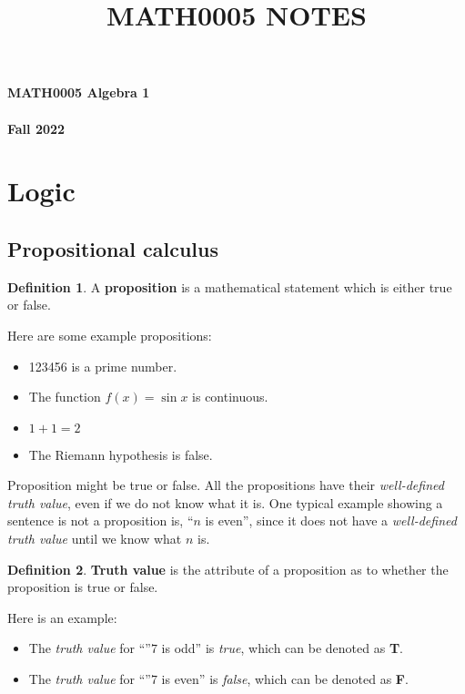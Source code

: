 \documentclass[11pt]{article}
\theoremstyle{definition}
\newtheorem{defn}{Definition}[subsection]
\begin{document}
\setcounter{section}{0}
\title{MATH0005 NOTES}

\thispagestyle{empty}

\begin{center}
{\LARGE \bf MATH0005 Algebra 1}\\
\quad\\
{\Large \bf Fall 2022}
\end{center}
\tableofcontents
\newpage

\section{Logic}
\subsection{Propositional calculus}
\begin{shaded}
\begin{defn}
    A \textbf{proposition} is a mathematical statement which is either true or false.
\end{defn}
\end{shaded}
Here are some example propositions:
    \begin{itemize}
        \item 123456 is a prime number.
        \item The function $f(x)= \sin x$ is continuous.
        \item $1+1=2$
        \item The Riemann hypothesis is false.
    \end{itemize}
Proposition might be true or false. All the propositions have their \textit{well-defined truth value}, even if we do not know what it is. One typical example showing a sentence is not a proposition is, ``$n$ is even'', since it does not have a \textit{well-defined truth value} until we know what $n$ is.

\begin{shaded}
\begin{defn}
\textbf{Truth value} is the attribute of a proposition as to whether the proposition is true or false.
\end{defn}
\end{shaded}

Here is an example:
\begin{itemize}
    \item The \textit{truth value} for ``''$7$ is odd'' is \textit{true}, which can be denoted as \textbf{T}.
    \item The \textit{truth value} for ``''$7$ is even'' is \textit{false}, which can be denoted as \textbf{F}.
\end{itemize}
\end{document}
